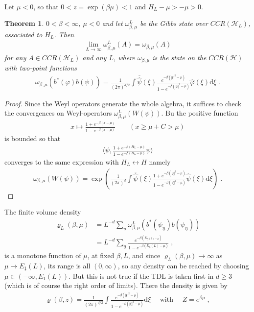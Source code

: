 \documentclass[
a4paper, %
11pt, %
onecolumn, %
openany, %
]{memoir}
\theoremstyle{definition}
\theoremstyle{remark}
\theoremstyle{plain}
\newtheorem{theorem}[definition]{Theorem}
\begin{document}
	Let $\mu<0$, so that $0<z=\exp(\beta \mu)<1$ and $H_L-\mu>-\mu>0$.
	\begin{theorem}
		$0<\beta<\infty$, $\mu<0$ and let $\omega_{\beta,\mu}^L$ be the Gibbs state over $CCR(\mathcal{H}_L)$, associated to $H_L$. Then \begin{align}
		\lim_{L\rightarrow\infty}\omega_{\beta,\mu}^L(A)=\omega_{\beta,\mu}(A)
		\end{align}
		for any $A\in CCR(\mathcal{H}_{L})$ and any $L$, where $\omega_{\beta,\mu}$ is the state on the $CCR(\mathcal{H})$ with two-point functions \begin{align}
		\omega_{\beta,\mu}(b^*(\varphi)b(\psi))=\frac{1}{(2\pi)^{d/2}}\int \overline{\hat{\psi}}(\xi)\frac{e^{-\beta(|\xi|^2-\mu)}}{1-e^{-\beta(|\xi|^2-\mu)}}\hat{\varphi}(\xi)\mathrm{d}\xi\; .
		\end{align}
	\end{theorem}
\begin{proof}
	Since the Weyl operators generate the whole algebra, it suffices to check the convergences on Weyl-operators $\omega_{\beta,\mu}^L(W(\psi))$. Bu the positive function \begin{align}
	x\mapsto \frac{1+e^{-\beta(x-\mu)}}{1-e^{-\beta(x-\mu)}}\qquad (x\geq \mu+C>\mu)
	\end{align}
	is bounded so that \begin{align}
	\langle \psi, \frac{1+e^{-\beta(H_L-\mu)}}{1-e^{-\beta(H_L-\mu)}}\psi\rangle
	\end{align}
	converges to the same expression with $H_L\leftrightarrow H$ namely \begin{align}
	\omega_{\beta,\mu}(W(\psi))=\exp\left(\frac{1}{(2\pi)^d}\int \overline{\hat{\psi}}(\xi)\frac{1+e^{-\beta(|\xi|^2-\mu)}}{1-e^{-\beta(|\xi|^2-\mu)}}\hat{\psi}(\xi)\mathrm{d}\xi\right)\; .
	\end{align}
\end{proof}
The finite volume density \begin{align}
\varrho_L(\beta,\mu)&=L^{-d}\sum_{\underline{n}}\omega_{\beta,\mu}^L(b^*(\psi_{\underline{n}})b(\psi_{\underline{n}}))\\
&=L^{-d}\sum_{\underline{n}}\frac{e^{-\beta(E_{\underline{n}(L)-\mu})}}{1-e^{-\beta(E_{\underline{n}}(L)-\mu)}}\; ,
\end{align}
is a monotone function of $\mu$, at fixed $\beta, L$, and since $\varrho_L(\beta,\mu)\rightarrow\infty$ as $\mu\rightarrow E_{\underline{1}}(L)$, its range is all $(0,\infty)$, so any density can be reached by choosing $\mu\in(-\infty,E_1(L))$. But this is not true if the TDL is taken first in $d\geq 3$ (which is of course the right order of limits). There the density is given by \begin{align}
\varrho(\beta, z)=\frac{1}{(2\pi)^{d/2}} \int \frac{e^{-\beta(|\xi|^2-\mu)}}{1-e^{-\beta(|\xi|^2-\mu)}}\mathrm{d}\xi \quad\text{ with }\quad Z=e^{\beta\mu}\;,
\end{align}
\end{document}
